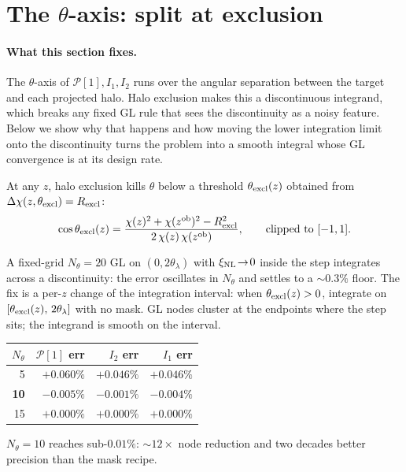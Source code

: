 \documentclass[a4paper, 11pt]{article}
\newcommand{\zob}{z^{\rm ob}}
\newcommand{\xinl}{\xi_{\rm NL}}
\newcommand{\Pop}{\mathcal{P}}
\begin{document}
\section{\texorpdfstring{The \(\theta\)-axis: split at exclusion}{The theta-axis: split at exclusion}}
\label{sec:theta_split}

\paragraph{What this section fixes.}
The \(\theta\)-axis of \(\Pop[1], I_1, I_2\) runs over the angular
separation between the target and each projected halo. Halo
exclusion makes this a discontinuous integrand, which breaks any
fixed GL rule that sees the discontinuity as a noisy feature. Below
we show why that happens and how moving the lower integration
limit onto the discontinuity turns the problem into a smooth
integral whose GL convergence is at its design rate.

At any \(z\), halo exclusion kills \(\theta\) below a threshold
\(\theta_{\rm excl}(z)\) obtained from
\(\Delta\chi(z,\theta_{\rm excl})=R_{\rm excl}\):
\begin{equation}
\cos\theta_{\rm excl}(z)
= \frac{\chi(z)^2+\chi(\zob)^2-R_{\rm excl}^2}{2\,\chi(z)\,\chi(\zob)},
\qquad \text{clipped to }[-1,1].
\label{eq:theta_excl_def}
\end{equation}

A fixed-grid \(N_\theta\!=\!20\) GL on \((0,2\theta_\lambda)\) with
\(\xinl\!\to\!0\) inside the step integrates across a
discontinuity: the error oscillates in \(N_\theta\) and settles to
a \(\sim 0.3\%\) floor. The fix is a per-\(z\) change of the
integration interval: when \(\theta_{\rm excl}(z)>0\), integrate on
\([\theta_{\rm excl}(z),\,2\theta_\lambda]\) with no mask. GL
nodes cluster at the endpoints where the step sits; the integrand
is smooth on the interval.
\begin{center}
\small
\begin{tabular}{r r r r}
\toprule
\(N_\theta\) & \(\Pop[1]\) err & \(I_2\) err & \(I_1\) err \\
\midrule
5   & \(+0.060\%\) & \(+0.046\%\) & \(+0.046\%\) \\
\textbf{10}  & \(\mathbf{-0.005\%}\) & \(\mathbf{-0.001\%}\) & \(\mathbf{-0.004\%}\) \\
15  & \(+0.000\%\) & \(+0.000\%\) & \(+0.000\%\) \\
\bottomrule
\end{tabular}
\end{center}
\(N_\theta=10\) reaches sub-\(0.01\%\): \(\sim 12\times\) node
reduction and two decades better precision than the mask recipe.
\end{document}
